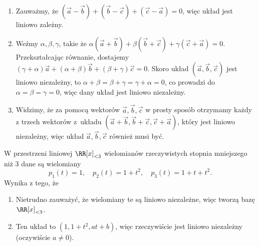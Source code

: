 \begin{solutions}
    \begin{enumerate}[\bf A.]
        \item Zauważmy, że $(\vec{a}-\vec{b})+(\vec{b}-\vec{c})+(\vec{c}-\vec{a})=0$, więc układ jest liniowo zależny.
        
        \item Weźmy $\alpha,\beta,\gamma$, takie że $\alpha(\vec{a}+\vec{b})+\beta(\vec{b}+\vec{c})+\gamma(\vec{c}+\vec{a})=0$. Przekształcając równanie, dostajemy $(\gamma+\alpha)\vec{a}+(\alpha+\beta)\vec{b}+(\beta+\gamma)\vec{c}=0$. Skoro układ $(\vec{a},\vec{b},\vec{c})$ jest liniowo niezależny, to $\alpha+\beta=\beta+\gamma=\gamma+\alpha=0$, co prowadzi do $\alpha=\beta=\gamma=0$, więc dany układ jest liniowo niezależny.

        \item Widzimy, że za pomocą wektorów $\vec{a},\vec{b},\vec{c}$ w prosty sposób otrzymamy każdy z trzech wektorów z~układu $(\vec{a}+\vec{b},\vec{b}+\vec{c},\vec{c}+\vec{a})$, który jest liniowo niezależny, więc układ $\vec{a},\vec{b},\vec{c}$ również musi być.
    \end{enumerate}

    \sol W przestrzeni liniowej $\RR[x]_{<3}$ wielomianów rzeczywistych stopnia mniejszego niż 3 dane są wielomiany
    $$p_1(t)=1,\quad p_2(t)=1+t^2,\quad p_3(t)=1+t+t^2.$$
    Wynika z tego, że

    \begin{enumerate}[\bf A.]
        \item Nietrudno zauważyć, że wielomiany te są liniowo niezależne, więc tworzą bazę $\RR[x]_{<3}$.

        \item Ten układ to $(1, 1+t^2, at+b)$, więc rzeczywiście jest liniowo niezależny (oczywiście $a\neq0$).


\end{enumerate}
\end{solutions}
